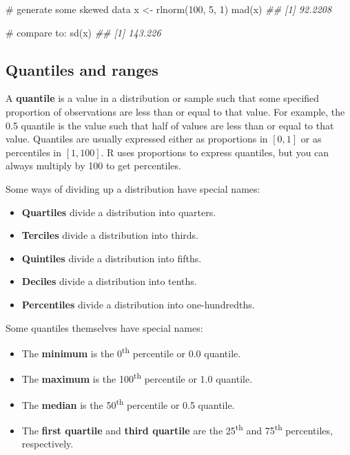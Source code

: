 \documentclass[
  13,
  letterpaper,
]{report}
\newenvironment{Shaded}{\begin{snugshade}}{\end{snugshade}}
\newcommand{\CommentTok}[1]{\textcolor[rgb]{0.37,0.37,0.37}{#1}}
\newcommand{\DecValTok}[1]{\textcolor[rgb]{0.68,0.00,0.00}{#1}}
\newcommand{\DocumentationTok}[1]{\textcolor[rgb]{0.37,0.37,0.37}{\textit{#1}}}
\newcommand{\FunctionTok}[1]{\textcolor[rgb]{0.28,0.35,0.67}{#1}}
\newcommand{\NormalTok}[1]{\textcolor[rgb]{0.00,0.23,0.31}{#1}}
\newcommand{\OtherTok}[1]{\textcolor[rgb]{0.00,0.23,0.31}{#1}}
\begin{document}
\begin{Shaded}
\begin{Highlighting}[]
\CommentTok{\# generate some skewed data}
\NormalTok{x }\OtherTok{\textless{}{-}} \FunctionTok{rlnorm}\NormalTok{(}\DecValTok{100}\NormalTok{, }\DecValTok{5}\NormalTok{, }\DecValTok{1}\NormalTok{)}
\FunctionTok{mad}\NormalTok{(x)}
\DocumentationTok{\#\# [1] 92.2208}

\CommentTok{\# compare to:}
\FunctionTok{sd}\NormalTok{(x)}
\DocumentationTok{\#\# [1] 143.226}
\end{Highlighting}
\end{Shaded}

\subsection{Quantiles and ranges}\label{sec-desc-var-qu}

A \textbf{quantile} is a value in a distribution or sample such that
some specified proportion of observations are less than or equal to that
value. For example, the 0.5 quantile is the value such that half of
values are less than or equal to that value. Quantiles are usually
expressed either as proportions in \(\left[0,1\right]\) or as
percentiles in \(\left[1,100\right]\). R uses proportions to express
quantiles, but you can always multiply by 100 to get percentiles.

Some ways of dividing up a distribution have special names:

\begin{itemize}
\item
  \textbf{Quartiles} divide a distribution into quarters.
\item
  \textbf{Terciles} divide a distribution into thirds.
\item
  \textbf{Quintiles} divide a distribution into fifths.
\item
  \textbf{Deciles} divide a distribution into tenths.
\item
  \textbf{Percentiles} divide a distribution into one-hundredths.
\end{itemize}

Some quantiles themselves have special names:

\begin{itemize}
\item
  The \textbf{minimum} is the 0\textsuperscript{th} percentile or 0.0
  quantile.
\item
  The \textbf{maximum} is the 100\textsuperscript{th} percentile or 1.0
  quantile.
\item
  The \textbf{median} is the 50\textsuperscript{th} percentile or 0.5
  quantile.
\item
  The \textbf{first quartile} and \textbf{third quartile} are the
  25\textsuperscript{th} and 75\textsuperscript{th} percentiles,
  respectively.
\end{itemize}
\end{document}

